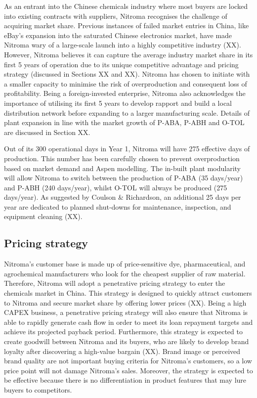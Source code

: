As an entrant into the Chinese chemicals industry where most buyers are locked into existing contracts with suppliers, Nitroma recognises the challenge of acquiring market share. Previous instances of failed market entries in China, like eBay’s expansion into the saturated Chinese electronics market, have made Nitroma wary of a large-scale launch into a highly competitive industry (XX). However, Nitroma believes it can capture the average industry market share in its first 5 years of operation due to its unique competitive advantage and pricing strategy (discussed in Sections XX and XX). Nitroma has chosen to initiate with a smaller capacity to minimise the risk of overproduction and consequent loss of profitability. Being a foreign-invested enterprise, Nitroma also acknowledges the importance of utilising its first 5 years to develop rapport and build a local distribution network before expanding to a larger manufacturing scale. Details of plant expansion in line with the market growth of P-ABA, P-ABH and O-TOL are discussed in Section XX.

Out of its 300 operational days in Year 1, Nitroma will have 275 effective days of production. This number has been carefully chosen to prevent overproduction based on market demand and Aspen modelling. The in-built plant modularity will allow Nitroma to switch between the production of P-ABA (35 days/year) and P-ABH (240 days/year), whilst O-TOL will always be produced (275 days/year). As suggested by Coulson & Richardson, an additional 25 days per year are dedicated to planned shut-downs for maintenance, inspection, and equipment cleaning (XX). 

\subsection{Pricing strategy}
Nitroma’s customer base is made up of price-sensitive dye, pharmaceutical, and agrochemical manufacturers who look for the cheapest supplier of raw material. Therefore, Nitroma will adopt a penetrative pricing strategy to enter the chemicals market in China. This strategy is designed to quickly attract customers to Nitroma and secure market share by offering lower prices (XX). Being a high CAPEX business, a penetrative pricing strategy will also ensure that Nitroma is able to rapidly generate cash flow in order to meet its loan repayment targets and achieve its projected payback period. Furthermore, this strategy is expected to create goodwill between Nitroma and its buyers, who are likely to develop brand loyalty after discovering a high-value bargain (XX). Brand image or perceived brand quality are not important buying criteria for Nitroma’s customers, so a low price point will not damage Nitroma’s sales. Moreover, the strategy is expected to be effective because there is no differentiation in product features that may lure buyers to competitors.

